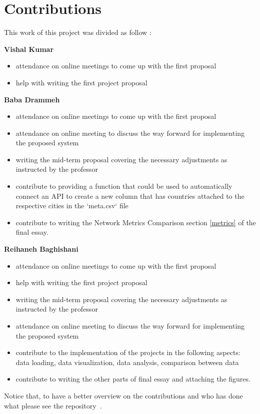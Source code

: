 \section{Contributions}

This work of this project was divided as follow :

\textbf {Vishal Kumar}

\begin{itemize}
    \item attendance on online meetings to come up with the first proposal
    \item help with writing the first project proposal
\end{itemize}

\textbf {Baba Drammeh}

\begin{itemize}
    \item attendance on online meetings to come up with the first proposal
    \item attendance on online meeting to discuss the way forward for implementing the proposed system
    \item     writing the mid-term proposal covering the necessary adjustments as instructed by the professor
    \item contribute to providing a function that could be used to automatically connect an API to create a new column that has countries attached to the respective cities in the `meta.csv` file
    \item contribute to writing the Network Metrics Comparison section \ref{metrics} of the final essay.
\end{itemize}


\textbf {Reihaneh Baghishani}

\begin{itemize}
    \item attendance on online meetings to come up with the first proposal
    \item help with writing the first project proposal
    \item writing the mid-term proposal covering the necessary adjustments as instructed by the professor
    \item attendance on online meeting to discuss the way forward for implementing the proposed system
    \item contribute to the implementation of the projects in the following aspects: data loading, data visualization, data analysis, comparison between data
    \item contribute to writing the other parts of final essay and attaching the figures.
\end{itemize}

Notice that, to have a better overview on the contributions and who has done what please see the repository~\cite{github-code}.